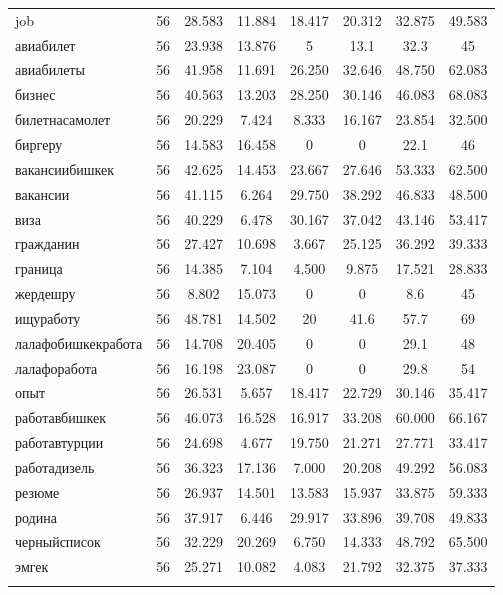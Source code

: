 \begin{table}[!htbp]
\begin{tabular}{@{\extracolsep{5pt}}lccccccc}
job & 56 & 28.583 & 11.884 & 18.417 & 20.312 & 32.875 & 49.583 \\ 
авиабилет & 56 & 23.938 & 13.876 & 5 & 13.1 & 32.3 & 45 \\ 
авиабилеты & 56 & 41.958 & 11.691 & 26.250 & 32.646 & 48.750 & 62.083 \\ 
бизнес & 56 & 40.563 & 13.203 & 28.250 & 30.146 & 46.083 & 68.083 \\ 
билетнасамолет & 56 & 20.229 & 7.424 & 8.333 & 16.167 & 23.854 & 32.500 \\ 
биргеру & 56 & 14.583 & 16.458 & 0 & 0 & 22.1 & 46 \\ 
вакансиибишкек & 56 & 42.625 & 14.453 & 23.667 & 27.646 & 53.333 & 62.500 \\ 
вакансии & 56 & 41.115 & 6.264 & 29.750 & 38.292 & 46.833 & 48.500 \\ 
виза & 56 & 40.229 & 6.478 & 30.167 & 37.042 & 43.146 & 53.417 \\ 
гражданин & 56 & 27.427 & 10.698 & 3.667 & 25.125 & 36.292 & 39.333 \\ 
граница & 56 & 14.385 & 7.104 & 4.500 & 9.875 & 17.521 & 28.833 \\ 
жердешру & 56 & 8.802 & 15.073 & 0 & 0 & 8.6 & 45 \\ 
ищуработу & 56 & 48.781 & 14.502 & 20 & 41.6 & 57.7 & 69 \\ 
лалафобишкекработа & 56 & 14.708 & 20.405 & 0 & 0 & 29.1 & 48 \\ 
лалафоработа & 56 & 16.198 & 23.087 & 0 & 0 & 29.8 & 54 \\ 
опыт & 56 & 26.531 & 5.657 & 18.417 & 22.729 & 30.146 & 35.417 \\ 
работавбишкек & 56 & 46.073 & 16.528 & 16.917 & 33.208 & 60.000 & 66.167 \\ 
работавтурции & 56 & 24.698 & 4.677 & 19.750 & 21.271 & 27.771 & 33.417 \\ 
работадизель & 56 & 36.323 & 17.136 & 7.000 & 20.208 & 49.292 & 56.083 \\ 
резюме & 56 & 26.937 & 14.501 & 13.583 & 15.937 & 33.875 & 59.333 \\ 
родина & 56 & 37.917 & 6.446 & 29.917 & 33.896 & 39.708 & 49.833 \\ 
черныйсписок & 56 & 32.229 & 20.269 & 6.750 & 14.333 & 48.792 & 65.500 \\ 
эмгек & 56 & 25.271 & 10.082 & 4.083 & 21.792 & 32.375 & 37.333 \\ 
\hline \\[-1.8ex] 
\end{tabular} 
\end{table}